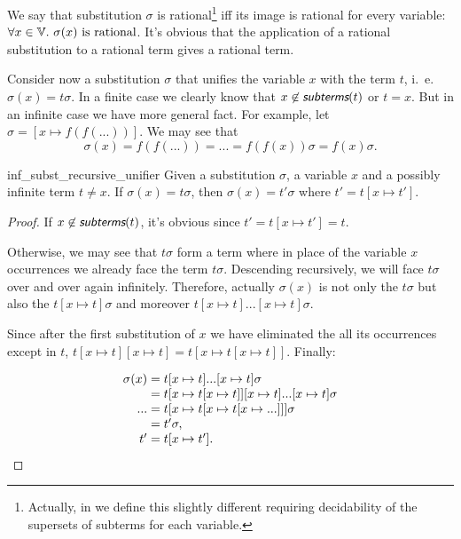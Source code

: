 We say that substitution $\sigma$ is rational\footnote{Actually, in \Rocq we define this slightly different requiring decidability of the supersets of subterms for each variable.} iff its image is rational for every variable: $\forall x \in \mathbb{V}. ~ \sigma(x) \text{ is rational}$. It's obvious that the application of a rational substitution to a rational term gives a rational term.

Consider now a substitution $\sigma$ that unifies the variable $x$ with the term $t$, i.~e. $\sigma(x) = t \sigma$. In a finite case we clearly know that $x \not\in \subterms(t)$ or $t = x$. But in an infinite case we have more general fact.
For example, let $\sigma = [x \mapsto f(f(...))]$. We may see that
\[\sigma(x) = f(f(...)) = ... = f(f(x)) \sigma = f(x) \sigma.\]

\begin{rocqlemma}{inf_subst_recursive_unifier}
    Given a substitution $\sigma$, a variable $x$ and a possibly infinite term $t \neq x$. If $\sigma(x) = t \sigma$, then $\sigma(x) = t' \sigma$ where $t' = t [x \mapsto t']$.
    \label{lemma:recursive-unifier}
\end{rocqlemma}
\begin{proof}
    If $x \not\in \subterms(t)$, it's obvious since $t' = t [x \mapsto t'] = t$.

    Otherwise, we may see that $t \sigma$ form a term where in place of the variable $x$ occurrences we already face the term $t \sigma$. Descending recursively, we will face $t \sigma$ over and over again infinitely. Therefore, actually $\sigma(x)$ is not only the $t \sigma$ but also the $t [x \mapsto t] \sigma$ and moreover $t [x \mapsto t] ... [x \mapsto t] \sigma$.

    Since after the first substitution of $x$ we have eliminated the all its occurrences except in $t$, $t [x \mapsto t] [x \mapsto t] = t [x \mapsto t [x \mapsto t]]$. Finally:

    \begin{equation*}
        \begin{array}{r@{{}={}}l}
            \sigma(x) & t [x \mapsto t] ... [x \mapsto t] \sigma \\
            & t [x \mapsto t [x \mapsto t]] [x \mapsto t] ... [x \mapsto t] \sigma \\
            ... & t [x \mapsto t [x \mapsto t [x \mapsto ...]]] \sigma \\
            & t' \sigma, \\
            t' & t [x \mapsto t']. \\
        \end{array}
    \end{equation*}
\end{proof}

